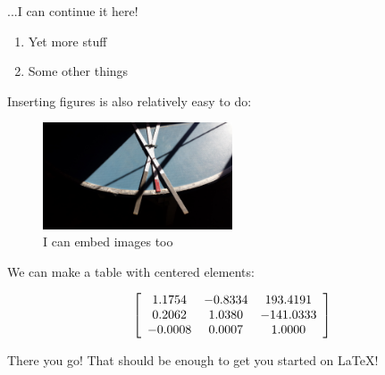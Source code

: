 \documentclass[a4paper,12pt]{article} %
\begin{document}
...I can continue it here!

\vspace{5mm}
\begin{enumerate}[resume]
\item Yet more stuff
\item Some other things
\end{enumerate}
\vspace{5mm}

Inserting figures is also relatively easy to do: 

\vspace{5mm}
\begin{figure}[!ht]
  \centering
  \includegraphics[width=0.5\textwidth]{test_image.jpg}
  \caption{I can embed images too}
\end{figure}

\noindent
We can make a table with centered elements:

\vspace{5mm}
\[ \left[ \begin{array}{c c c}
1.1754 & -0.8334 & 193.4191\\
0.2062 & 1.0380 & -141.0333\\
-0.0008 & 0.0007 & 1.0000\\
\end{array}
\right] \]
\vspace{5mm}

\noindent
There you go! That should be enough to get you started on LaTeX!
\end{document}
